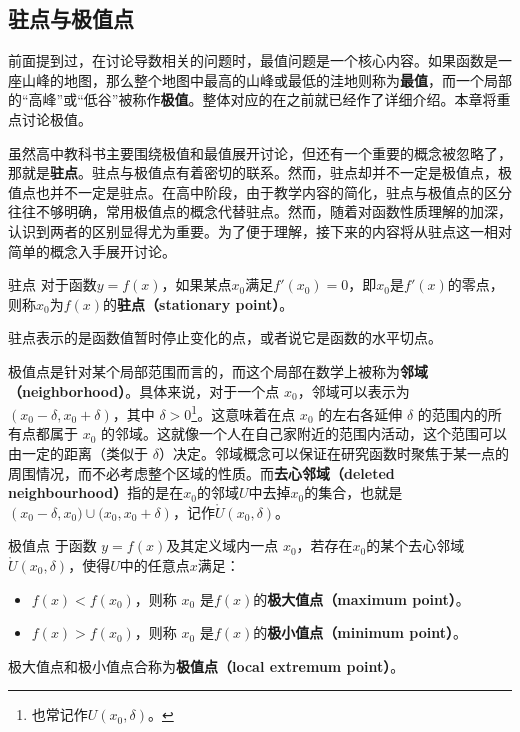 \subsection{驻点与极值点}

前面提到过，在讨论导数相关的问题时，最值问题是一个核心内容。如果函数是一座山峰的地图，那么整个地图中最高的山峰或最低的洼地则称为\textbf{最值}，而一个局部的“高峰”或“低谷”被称作\textbf{极值}。整体对应的在之前就已经作了详细介绍。本章将重点讨论极值。

虽然高中教科书主要围绕极值和最值展开讨论，但还有一个重要的概念被忽略了，那就是\textbf{驻点}。驻点与极值点有着密切的联系。然而，驻点却并不一定是极值点，极值点也并不一定是驻点。在高中阶段，由于教学内容的简化，驻点与极值点的区分往往不够明确，常用极值点的概念代替驻点。然而，随着对函数性质理解的加深，认识到两者的区别显得尤为重要。为了便于理解，接下来的内容将从驻点这一相对简单的概念入手展开讨论。

\begin{definition}{驻点}
对于函数$y=f(x)$，如果某点$x_0$满足$f'(x_0)=0$，即$x_0$是$f'(x)$的零点，则称$x_0$为$f(x)$的\textbf{驻点（stationary point）}。
\end{definition}

驻点表示的是函数值暂时停止变化的点，或者说它是函数的水平切点。

极值点是针对某个局部范围而言的，而这个局部在数学上被称为\textbf{邻域（neighborhood）}。具体来说，对于一个点 $x_0$，邻域可以表示为 $\left( x_0 - \delta, x_0 + \delta \right)$，其中 $\delta > 0$\footnote{也常记作${U}(x_0, \delta)$。}。这意味着在点 $x_0$ 的左右各延伸 $\delta$ 的范围内的所有点都属于 $x_0$ 的邻域。这就像一个人在自己家附近的范围内活动，这个范围可以由一定的距离（类似于 $\delta$）决定。邻域概念可以保证在研究函数时聚焦于某一点的周围情况，而不必考虑整个区域的性质。而\textbf{去心邻域（deleted neighbourhood）}指的是在$x_0$的邻域$U$中去掉$x_0$的集合，也就是$\left( x_0 - \delta,x_0)\cup(x_0, x_0 + \delta \right)$，记作$\mathring{U}(x_0,\delta)$。

\begin{definition}{极值点}
于函数 $y=f(x)$及其定义域内一点 $x_0$，若存在$x_0$的某个去心邻域$\mathring{U}(x_0,\delta)$，使得$U$中的任意点$x$满足：
\begin{itemize}
\item $f(x) < f\left(x_0\right)$，则称 $x_0$ 是$f(x)$的\textbf{极大值点（maximum point）}。
\item $f(x) > f\left(x_0\right)$，则称 $x_0$ 是$f(x)$的\textbf{极小值点（minimum point）}。
\end{itemize}
极大值点和极小值点合称为\textbf{极值点（local extremum point）}。
\end{definition}

